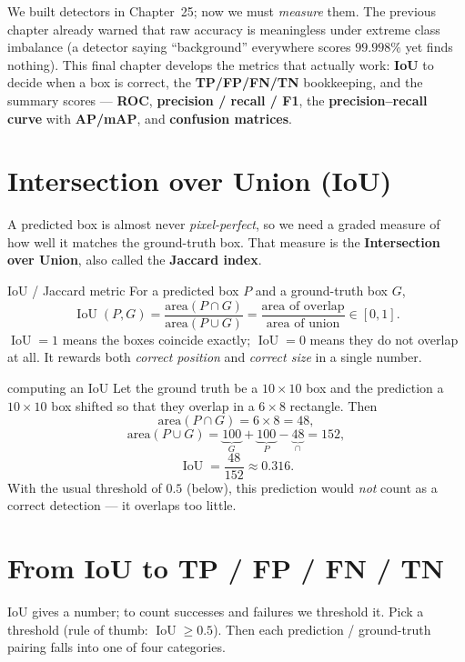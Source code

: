 \documentclass{report}
\DeclareMathOperator{\IoU}{IoU}
\begin{document}
We built detectors in Chapter~25; now we must \emph{measure} them. The previous
chapter already warned that raw accuracy is meaningless under extreme class
imbalance (a detector saying ``background'' everywhere scores $99.998\%$ yet
finds nothing). This final chapter develops the metrics that actually work:
\textbf{IoU} to decide when a box is correct, the \textbf{TP/FP/FN/TN}
bookkeeping, and the summary scores --- \textbf{ROC}, \textbf{precision /
recall / F1}, the \textbf{precision--recall curve} with \textbf{AP/mAP}, and
\textbf{confusion matrices}.

\section{Intersection over Union (IoU)}

A predicted box is almost never \emph{pixel-perfect}, so we need a graded
measure of how well it matches the ground-truth box. That measure is the
\textbf{Intersection over Union}, also called the \textbf{Jaccard index}.

\begin{defbox}{IoU / Jaccard metric}
For a predicted box $P$ and a ground-truth box $G$,
\[
\IoU(P,G) = \frac{\text{area}(P \cap G)}{\text{area}(P \cup G)}
= \frac{\text{area of overlap}}{\text{area of union}} \in [0,1].
\]
$\IoU = 1$ means the boxes coincide exactly; $\IoU = 0$ means they do not
overlap at all. It rewards both \emph{correct position} and \emph{correct
size} in a single number.
\end{defbox}

\begin{exbox}{computing an IoU}
Let the ground truth be a $10\times10$ box and the prediction a $10\times10$
box shifted so that they overlap in a $6\times8$ rectangle. Then
\[
\text{area}(P\cap G) = 6\times 8 = 48,
\]
\[
\text{area}(P\cup G) = \underbrace{100}_{G} + \underbrace{100}_{P}
- \underbrace{48}_{\cap} = 152,
\]
\[
\IoU = \frac{48}{152} \approx 0.316 .
\]
With the usual threshold of $0.5$ (below), this prediction would \emph{not}
count as a correct detection --- it overlaps too little.
\end{exbox}

\section{From IoU to TP / FP / FN / TN}

IoU gives a number; to count successes and failures we threshold it. Pick a
threshold (rule of thumb: $\IoU \geq 0.5$). Then each prediction / ground-truth
pairing falls into one of four categories.
\end{document}
